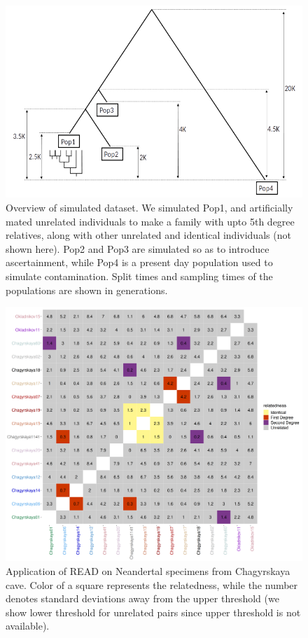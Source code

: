 \documentclass[12pt, letterpaper]{article}
\begin{document}
\begin{figure}[h!]
    \includegraphics[width=18cm]{plots/inkscape_finalImg/pedigree.png}
    \centering
    \caption{Overview of simulated dataset. We simulated Pop1, and artificially mated unrelated individuals to make a family with upto 5th degree relatives, along with other unrelated and identical individuals (not shown here). Pop2 and Pop3 are simulated so as to introduce ascertainment, while Pop4 is a present day population used to simulate contamination. Split times and sampling times of the populations are shown in generations.}
    \label{figS10:pedigree}
    
\end{figure}


\begin{figure}[h!]
    \includegraphics[width=18cm]{supplementary_info/plots/fil0_read_plot.png}
    \centering
    \caption{Application of READ on Neandertal specimens from Chagyrskaya cave. Color of a square represents the relatedness, while the number denotes standard deviations away from the upper threshold (we show lower threshold for unrelated pairs since upper threshold is not available).}
    \label{figS2:Chagyrskaya_READ}
\end{figure}
\end{document}
